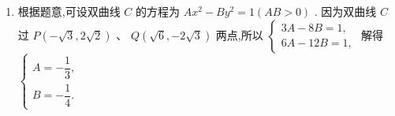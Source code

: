 \begin{enumerate}
\begin{jieda}
\begin{enumerate}
            设所求双曲线的方程为: $\dfrac{{x}^{2}}{{a}_{1}^{2}} - \dfrac{{y}^{2}}{{b}_{1}^{2}} = 1\left( {{a}_{1} > 0,{b}_{1} > 0}\right)$ ,则 ${c}_{1}^{2} = {a}_{1}^{2} + {b}_{1}^{2} = 3$.
            因此，所求双曲线的标准方程为 ${x}^{2} - \dfrac{{y}^{2}}{2} = 1$ .
            
            \item 根据题意,可设双曲线 $C$ 的方程为 $A{x}^{2} - B{y}^{2} = 1\left( {{AB} > 0}\right)$ . 因为双曲线 $C$ 过 $P\left( {-\sqrt{3},2\sqrt{2}}\right) \text{ 、 }Q\left( {\sqrt{6}, - 2\sqrt{3}}\right)$ 两点,所以 $\left\{  \begin{array}{l} {3A} - {8B} = 1, \\  {6A} - {12B} = 1, \end{array}\right.$ 解得 $\left\{  \begin{array}{l} A =  - \dfrac{1}{3}, \\  B =  - \dfrac{1}{4}. \end{array}\right.$
            

\end{enumerate}
\end{jieda}
\end{enumerate}
